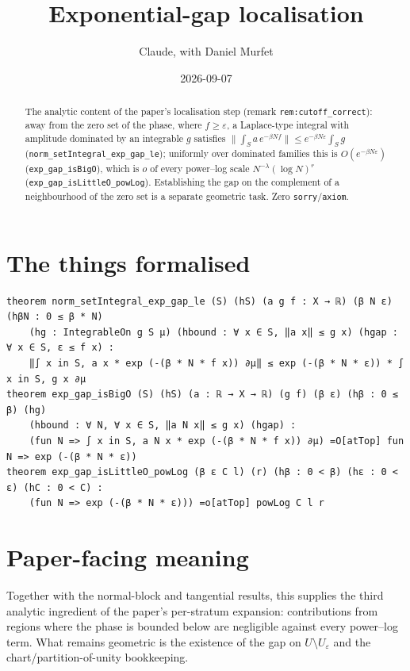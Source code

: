 \documentclass[11pt]{article}
\title{Exponential-gap localisation}
\author{Claude, with Daniel Murfet}
\date{2026-09-07}
\begin{document}
\maketitle
\sloppy

\begin{abstract}
The analytic content of the paper's localisation step (remark \texttt{rem:cutoff\_correct}): away
from the zero set of the phase, where $f\ge\varepsilon$, a Laplace-type integral with amplitude
dominated by an integrable $g$ satisfies
$\big\|\int_Sa\,e^{-\beta Nf}\big\|\le e^{-\beta N\varepsilon}\int_Sg$
(\texttt{norm\_setIntegral\_exp\_gap\_le}); uniformly over dominated families this is
$O(e^{-\beta N\varepsilon})$ (\texttt{exp\_gap\_isBigO}), which is $o$ of every power--log scale
$N^{-\lambda}(\log N)^r$ (\texttt{exp\_gap\_isLittleO\_powLog}). Establishing the gap on the complement
of a neighbourhood of the zero set is a separate geometric task. Zero \texttt{sorry}/\texttt{axiom}.
\end{abstract}

\section{The things formalised}
{\small
\begin{verbatim}
theorem norm_setIntegral_exp_gap_le (S) (hS) (a g f : X → ℝ) (β N ε) (hβN : 0 ≤ β * N)
    (hg : IntegrableOn g S μ) (hbound : ∀ x ∈ S, ‖a x‖ ≤ g x) (hgap : ∀ x ∈ S, ε ≤ f x) :
    ‖∫ x in S, a x * exp (-(β * N * f x)) ∂μ‖ ≤ exp (-(β * N * ε)) * ∫ x in S, g x ∂μ
theorem exp_gap_isBigO (S) (hS) (a : ℝ → X → ℝ) (g f) (β ε) (hβ : 0 ≤ β) (hg)
    (hbound : ∀ N, ∀ x ∈ S, ‖a N x‖ ≤ g x) (hgap) :
    (fun N => ∫ x in S, a N x * exp (-(β * N * f x)) ∂μ) =O[atTop] fun N => exp (-(β * N * ε))
theorem exp_gap_isLittleO_powLog (β ε C l) (r) (hβ : 0 < β) (hε : 0 < ε) (hC : 0 < C) :
    (fun N => exp (-(β * N * ε))) =o[atTop] powLog C l r
\end{verbatim}
}

\section{Paper-facing meaning}
Together with the normal-block and tangential results, this supplies the third analytic ingredient
of the paper's per-stratum expansion: contributions from regions where the phase is bounded below
are negligible against every power--log term. What remains geometric is the existence of the gap
on $U\setminus U_\varepsilon$ and the chart/partition-of-unity bookkeeping.
\end{document}
